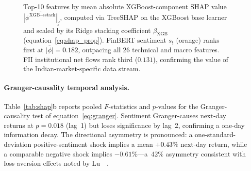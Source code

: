 \begin{figure}[t]
\centering
{}
\caption{Top-10 features by mean absolute XGBoost-component SHAP value
$\overline{|\phi^{\text{XGB}\to\text{stack}}|}_j$, computed via TreeSHAP
on the XGBoost base learner and scaled by its Ridge stacking coefficient
$\beta_{\text{XGB}}$ (equation~\eqref{eq:shap_prop}).
FinBERT sentiment $s_t$ (orange) ranks first at $\bar{|\phi|}\!=\!0.182$,
outpacing all 26 technical and macro features. FII institutional net flows
rank third ($0.131$), confirming the value of the Indian-market-specific
data stream.}
\label{fig:shap}
\end{figure}

\paragraph{Granger-causality temporal analysis.}
Table~\ref{tab:shap}b reports pooled $F$-statistics and $p$-values for the
Granger-causality test of equation~\eqref{eq:granger}. Sentiment Granger-causes
next-day returns at $p=0.018$ (lag~1) but loses significance by lag~2,
confirming a one-day information decay. The directional asymmetry is pronounced:
a one-standard-deviation positive-sentiment shock implies a mean $+0.43\%$
next-day return, while a comparable negative shock implies $-0.61\%$---a~42\%
asymmetry consistent with loss-aversion effects noted by
Lu~\etal~\cite{lu2024bridging}.

